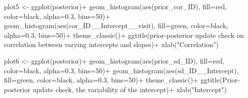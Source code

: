 \documentclass[
]{article}
\newenvironment{Shaded}{\begin{snugshade}}{\end{snugshade}}
\newcommand{\AttributeTok}[1]{\textcolor[rgb]{0.77,0.63,0.00}{#1}}
\newcommand{\DecValTok}[1]{\textcolor[rgb]{0.00,0.00,0.81}{#1}}
\newcommand{\FloatTok}[1]{\textcolor[rgb]{0.00,0.00,0.81}{#1}}
\newcommand{\FunctionTok}[1]{\textcolor[rgb]{0.00,0.00,0.00}{#1}}
\newcommand{\NormalTok}[1]{#1}
\newcommand{\OtherTok}[1]{\textcolor[rgb]{0.56,0.35,0.01}{#1}}
\newcommand{\SpecialCharTok}[1]{\textcolor[rgb]{0.00,0.00,0.00}{#1}}
\newcommand{\StringTok}[1]{\textcolor[rgb]{0.31,0.60,0.02}{#1}}
\begin{document}
\begin{Shaded}
\begin{Highlighting}[]
\NormalTok{plot5 }\OtherTok{\textless{}{-}} \FunctionTok{ggplot}\NormalTok{(posterior)}\SpecialCharTok{+}
  \FunctionTok{geom\_histogram}\NormalTok{(}\FunctionTok{aes}\NormalTok{(prior\_cor\_ID), }\AttributeTok{fill=}\StringTok{\textquotesingle{}red\textquotesingle{}}\NormalTok{, }\AttributeTok{color=}\StringTok{\textquotesingle{}black\textquotesingle{}}\NormalTok{, }\AttributeTok{alpha=}\FloatTok{0.3}\NormalTok{, }\AttributeTok{bins=}\DecValTok{50}\NormalTok{)}\SpecialCharTok{+}
  \FunctionTok{geom\_histogram}\NormalTok{(}\FunctionTok{aes}\NormalTok{(cor\_ID\_\_Intercept\_\_visit), }\AttributeTok{fill=}\StringTok{\textquotesingle{}green\textquotesingle{}}\NormalTok{, }\AttributeTok{color=}\StringTok{\textquotesingle{}black\textquotesingle{}}\NormalTok{, }\AttributeTok{alpha=}\FloatTok{0.3}\NormalTok{, }\AttributeTok{bins=}\DecValTok{50}\NormalTok{)}\SpecialCharTok{+}
  \FunctionTok{theme\_classic}\NormalTok{()}\SpecialCharTok{+}
  \FunctionTok{ggtitle}\NormalTok{(}\StringTok{\textquotesingle{}prior{-}posterior update check on correlation between varying intercepts and slopes\textquotesingle{}}\NormalTok{)}\SpecialCharTok{+}
  \FunctionTok{xlab}\NormalTok{(}\StringTok{"Correlation"}\NormalTok{)}

\NormalTok{plot6 }\OtherTok{\textless{}{-}} \FunctionTok{ggplot}\NormalTok{(posterior)}\SpecialCharTok{+}
  \FunctionTok{geom\_histogram}\NormalTok{(}\FunctionTok{aes}\NormalTok{(prior\_sd\_ID), }\AttributeTok{fill=}\StringTok{\textquotesingle{}red\textquotesingle{}}\NormalTok{, }\AttributeTok{color=}\StringTok{\textquotesingle{}black\textquotesingle{}}\NormalTok{, }\AttributeTok{alpha=}\FloatTok{0.3}\NormalTok{, }\AttributeTok{bins=}\DecValTok{50}\NormalTok{)}\SpecialCharTok{+}
  \FunctionTok{geom\_histogram}\NormalTok{(}\FunctionTok{aes}\NormalTok{(sd\_ID\_\_Intercept), }\AttributeTok{fill=}\StringTok{\textquotesingle{}green\textquotesingle{}}\NormalTok{, }\AttributeTok{color=}\StringTok{\textquotesingle{}black\textquotesingle{}}\NormalTok{, }\AttributeTok{alpha=}\FloatTok{0.3}\NormalTok{, }\AttributeTok{bins=}\DecValTok{50}\NormalTok{)}\SpecialCharTok{+}
  \FunctionTok{theme\_classic}\NormalTok{()}\SpecialCharTok{+}
  \FunctionTok{ggtitle}\NormalTok{(}\StringTok{\textquotesingle{}Prior{-}posterior update check, the variability of the intercept\textquotesingle{}}\NormalTok{)}\SpecialCharTok{+}
  \FunctionTok{xlab}\NormalTok{(}\StringTok{"Intercept"}\NormalTok{)}


\end{Highlighting}
\end{Shaded}
\end{document}
